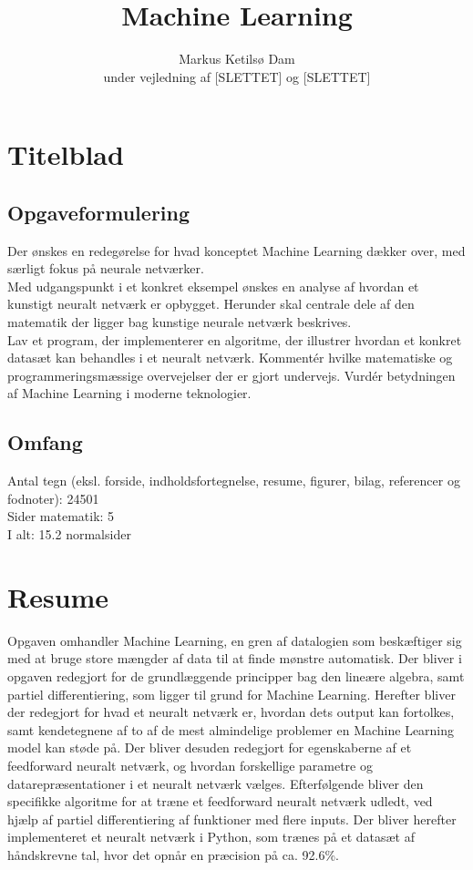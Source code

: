 \documentclass[a4paper, 12pt]{article}
\date{\displaydate{date}}
\theoremstyle{definition}
\begin{document}
\nohf{}

\title{Machine Learning}
\author{Markus Ketilsø Dam\\ \normalsize under vejledning af [SLETTET] og [SLETTET]}	
\maketitle
\begin{center}
  
\end{center}
\newpage
\section*{Titelblad}	
\subsection*{Opgaveformulering}
Der ønskes en redegørelse for hvad konceptet Machine Learning dækker over, med særligt fokus på neurale netværker.\\
Med udgangspunkt i et konkret eksempel ønskes en analyse af hvordan et kunstigt neuralt netværk er opbygget. Herunder skal centrale dele af den matematik der ligger bag kunstige neurale netværk beskrives.\\
Lav et program, der implementerer en algoritme, der illustrer hvordan et konkret datasæt kan behandles i et neuralt netværk. Kommentér hvilke matematiske og programmeringsmæssige overvejelser der er gjort undervejs. Vurdér betydningen af Machine Learning i moderne teknologier.

\subsection*{Omfang}
Antal tegn (eksl. forside, indholdsfortegnelse, resume, figurer, bilag, referencer og fodnoter): 24501\\
Sider matematik: 5\\
I alt: 15.2 normalsider

\section*{Resume}
Opgaven omhandler Machine Learning, en gren af datalogien som beskæftiger sig med at bruge store mængder af data til at finde mønstre automatisk. Der bliver i opgaven redegjort for de grundlæggende principper bag den lineære algebra, samt partiel differentiering, som ligger til grund for Machine Learning. Herefter bliver der redegjort for hvad et neuralt netværk er, hvordan dets output kan fortolkes, samt kendetegnene af to af de mest almindelige problemer en Machine Learning model kan støde på. Der bliver desuden redegjort for egenskaberne af et feedforward neuralt netværk, og hvordan forskellige parametre og datarepræsentationer i et neuralt netværk vælges. Efterfølgende bliver den specifikke algoritme for at træne et feedforward neuralt netværk udledt, ved hjælp af partiel differentiering af funktioner med flere inputs. Der bliver herefter implementeret et neuralt netværk i Python, som trænes på et datasæt af håndskrevne tal, hvor det opnår en præcision på ca. 92.6\%.
\end{document}

